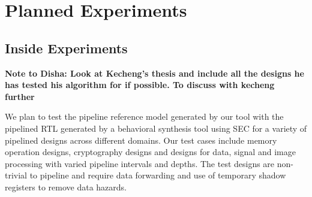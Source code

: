 \chapter{Planned Experiments}
\label{sec:SEC}

\section{Inside Experiments}
{\bf Note to Disha: Look at Kecheng's thesis and include all the designs he has tested his algorithm for if possible. To discuss with kecheng further}  

We plan to test the pipeline reference model generated by our tool with the pipelined RTL generated by a behavioral synthesis tool using SEC for a variety of pipelined designs across different domains. Our test cases include memory operation designs, cryptography designs and designs for data, signal and image processing with varied pipeline intervals and depths. The test designs are non-trivial to pipeline and require data forwarding and use of temporary shadow registers to remove data hazards.

